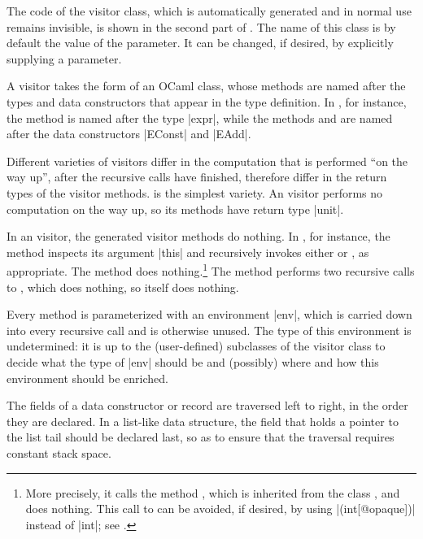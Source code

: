\documentclass[11pt,a4paper,twoside]{article}
\begin{document}
The code of the visitor class, which is automatically generated and in normal
use remains invisible, is shown in the second part of . The
name of this class is by default the value of the \variety parameter. It can
be changed, if desired, by explicitly supplying a \name parameter.

A visitor takes the form of an OCaml class, whose methods are named after the
types and data constructors that appear in the type definition. In
, for instance, the method  is named after
the type \oc|expr|, while the methods  and
 are named after the data constructors \oc|EConst| and
\oc|EAdd|.

Different varieties of visitors differ in the computation that is performed
``on the way up'', after the recursive calls have finished, therefore differ
in the return types of the visitor methods. \iter is the simplest variety. An
\iter visitor performs no computation on the way up, so its methods have
return type \oc|unit|.

In an \iter visitor, the generated visitor methods do nothing. In
, for instance, the method  inspects its
argument \oc|this| and recursively invokes either  or
, as appropriate. The method  does
nothing.\footnote{More precisely, it calls the method ,
  which is inherited from the class , and does
  nothing. This call to  can be avoided, if desired, by using
  \oc|(int[@opaque])| instead of \oc|int|; see .} The method
 performs two recursive calls to ,
which does nothing, so  itself does nothing.

Every method is parameterized with an environment \oc|env|, which is carried
down into every recursive call and is otherwise unused. The type of this
environment is undetermined: it is up to the (user-defined) subclasses of the
visitor class to decide what the type of \oc|env| should be and (possibly)
where and how this environment should be enriched.


The fields of a data constructor or record are traversed left to right, in the
order they are declared. In a list-like data structure, the field that holds a
pointer to the list tail should be declared last, so as to ensure that the
traversal requires constant stack space.
\end{document}
